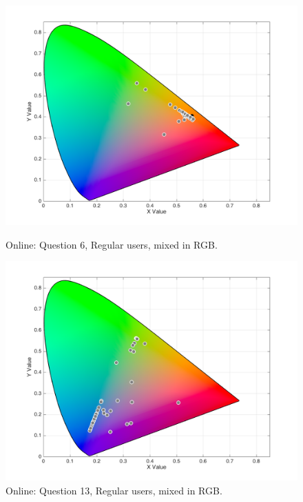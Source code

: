 \begin{figure}[!htbp]
  \centering
  \vspace{-10pt}
  \begin{minipage}{0.4\textwidth}
    \centering
    \includegraphics[width=\textwidth]{images/results/6_online_RGBresponses.png}
    \caption[Online: Answers for Question 6, from regular users, mixed in RGB Color Model.]{Online: Question 6, Regular users, mixed in RGB.}
    \label{fig:onlinergbregular_6}
  \end{minipage}
  \begin{minipage}{0.4\textwidth}
    \centering
    \includegraphics[width=\textwidth]{images/results/13_online_RGBresponses.png}
    \caption[Online: Answers for Question 13, from regular users, mixed in RGB Color Model.]{Online: Question 13, Regular users, mixed in RGB.}
    \label{fig:onlinergbregular_13}
  \end{minipage}
  \vspace{-5pt}
\end{figure}
